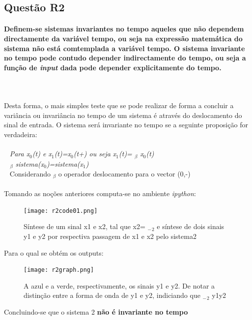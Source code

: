 \documentclass[a4paper,12pt]{article}
\begin{document}
		\subsection{Questão R2}
			\paragraph{Definem-se sistemas invariantes no tempo aqueles que não dependem directamente da variável tempo, ou seja na expressão matemática do sistema não está comtemplada a variável tempo. O sistema invariante no tempo pode contudo depender indirectamente do tempo, ou seja a função de \textit{input} dada pode depender explicitamente do tempo.}
			\mbox{}\\
			\mbox{}\\
			Desta forma, o mais simples teste que se pode realizar de forma a concluir a variância ou invariância no tempo de um sistema é através do deslocamento do sinal de entrada.
			O sistema será invariante no tempo se a seguinte proposição for verdadeira:
			\mbox{}\\
			\mbox{} \\
			\mbox{		} \textit{Para x$_0$(t) e x$_1$(t)=x$_0$(t+\textbeta) ou seja x$_1$(t)= $_\beta$ x$_0$(t)
			\\ 
			\mbox{          } $_\beta$ sistema(x$_0$)=sistema(x$_1$)}
			\mbox{}\\
			\mbox{          } Considerando $_\beta$ o operador deslocamento para o vector (0,-\textbeta)
\mbox{}\\\mbox{}\\
			Tomando as noções anteriores computa-se no ambiente \textit{ipython}:
			\begin{figure}[H]
    				\centering
    				\captionsetup{justification=centering}
    				\texttt{[image: r2code01.png]}
				\caption{Síntese de um sinal x1 e  x2, tal que x2= $_-$$_2$ e síntese de dois sinais y1 e y2 por respectiva passagem de x1 e x2 pelo sistema2}
    			\end{figure}
			Para o qual se obtém os outputs:
 			\begin{figure}[H]
      				\centering
      				\captionsetup{justification=centering}
      				\texttt{[image: r2graph.png]}
				\caption{A azul e a verde, respectivamente, os sinais y1 e y2. De notar a distinção entre a forma de onda de y1 e y2, indiciando que  $_-$$_2$ y1\neq y2}
      			\end{figure}
			Concluindo-se que o sistema 2 \textbf{não é invariante no tempo}
	\newpage	
\end{document}
